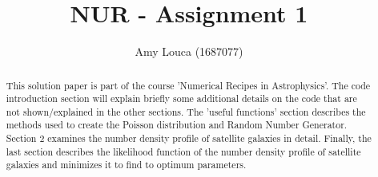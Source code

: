 \documentclass[a4paper,10pt]{article}
\title{NUR - Assignment 1 }
\author{Amy Louca (1687077)}
\begin{document}
\maketitle

\begin{abstract}
This solution paper is part of the course 'Numerical Recipes in Astrophysics'. The code introduction section will explain briefly some additional details on the code that are not shown/explained in the other sections. The 'useful functions' section describes the methods used to create the Poisson distribution and Random Number Generator. Section 2 examines the number density profile of satellite galaxies in detail. Finally, the last section describes the likelihood function of the number density profile of satellite galaxies and minimizes it to find to optimum parameters.
\end{abstract}


























\end{document}
